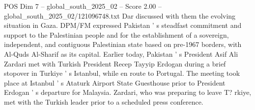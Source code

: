 \begin{textsample}{POS Dim 7 – global\_south\_2025\_02 – Score 2.00 – global\_south\_2025\_02/121096748.txt}
Dar discussed with them the evolving situation in Gaza.
DPM/FM expressed Pakistan ' s steadfast commitment and support to the Palestinian people and for the establishment of a sovereign, independent, and contiguous Palestinian state based on pre-1967 borders, with Al-Quds Al-Sharif as its capital.
Earlier today, Pakistan ' s President Asif Ali Zardari met with Turkish President Recep Tayyip Erdogan during a brief stopover in Turkiye ' s Istanbul, while en route to Portugal.
The meeting took place at Istanbul ' s Ataturk Airport State Guesthouse prior to President Erdogan ' s departure for Malaysia.
Zardari, who was preparing to leave T? rkiye, met with the Turkish leader prior to a scheduled press conference.

\end{textsample}
